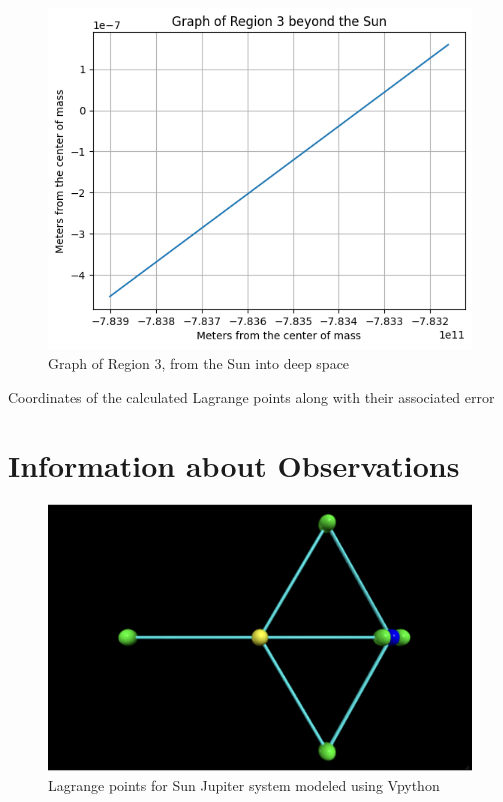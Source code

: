 \documentclass[linenumbers,RNAAS,trackchanges]{aastex631}
\begin{document}
\begin{figure}
    \centering
    \includegraphics[scale=.75]{l3.png}
    \caption{Graph of Region 3, from the Sun into deep space}
    \label{fig:code}
\end{figure}


\begin{table}[H]
\centering
{}
\caption{Coordinates of the calculated Lagrange points along with their associated error}
\end{table}


\newpage
\section{Information about Observations}\label{sec:observations}

\begin{figure}[H]
    \centering
    \includegraphics[scale=.75]{lagrangepoints.png}
    \caption{Lagrange points for Sun Jupiter system modeled using Vpython}
    \label{fig:code}
\end{figure}
\end{document}

